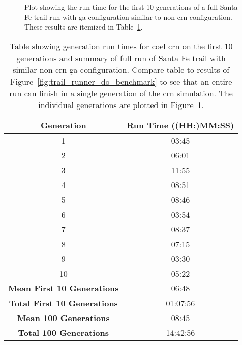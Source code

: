 \begin{figure}[ht]
\centering
{}
\caption[Run Time Benchmark of COEL Generations]{Plot showing the run time for the first 10 generations of a full Santa Fe trail run with \gls{ga} configuration similar to non-\gls{crn} configuration. These results are itemized in Table~\ref{tab:coel_benchmark_times}.}
\label{fig:coel_benchmark_chart}
\end{figure}

\begin{table}[ht]
\centering
\begin{tabular}{cc}
 \textbf{Generation} & \textbf{Run Time ((HH:)MM:SS)}  \\ \hline
1 & 03:45 \\
2 & 06:01 \\
3 & 11:55 \\
4 & 08:51 \\
5 & 08:46 \\
6 & 03:54 \\
7 & 08:37 \\
8 & 07:15 \\
9 & 03:30 \\
10 & 05:22 \\ \hline
\textbf{Mean First 10 Generations} & 06:48 \\
\textbf{Total First 10 Generations} & 01:07:56 \\ \hline \hline
\textbf{Mean 100 Generations} & 08:45 \\
\textbf{Total 100 Generations} & 14:42:56
\end{tabular}
\caption[Run Time Benchmark of COEL Generations]{Table showing generation run times for \gls{coel} \gls{crn} on the first 10 generations and summary of full run of Santa Fe trail with similar non-\gls{crn} \gls{ga} configuration. Compare table to results of Figure~\ref{fig:trail_runner_do_benchmark} to see that an entire run can finish in a single generation of the \gls{crn} simulation. The individual generations are plotted in Figure~\ref{fig:coel_benchmark_chart}.}
\label{tab:coel_benchmark_times}
\end{table}

